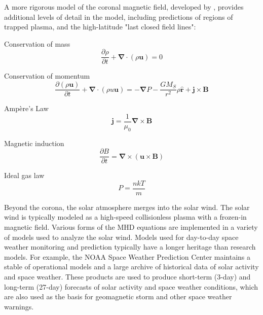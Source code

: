 \documentclass{article}
\begin{document}
A more rigorous model of the coronal magnetic field, developed by \cite{Endeve2003}, provides additional levels of detail in the model, including predictions of regions of trapped plasma, and the high-latitude "last closed field lines":

\bigskip

Conservation of mass
\begin{equation}
    \frac {\partial \rho} {\partial t} + \mathbf \nabla \cdotp \left(\rho \mathbf u \right) = 0
    \label{eq:ELH1}
\end{equation}

Conservation of momentum
\begin{equation}
    \frac {\partial \left( \rho \mathbf u \right)} {\partial t} + \mathbf \nabla \cdotp \left(\rho u \mathbf u \right) = - \mathbf \nabla P - \frac {G M_S} {r^2} \rho \mathbf {\hat r} + \mathbf j \times \mathbf B
    \label{eq:ELH2}
\end{equation}

Amp\`ere's Law
\begin{equation}
    \mathbf j = \frac {1} {\mu_0} \mathbf \nabla \times \mathbf B
    \label{eq:ELH3}
\end{equation}

Magnetic induction
\begin{equation}
    \frac {\partial B} {\partial t} = \mathbf \nabla \times \left( \mathbf u \times \mathbf B \right)
    \label{eq:ELH4}
\end{equation}

Ideal gas law
\begin{equation}
    P = \frac {n k T} {m}
    \label{eq:ELH5}
\end{equation}

Beyond the corona, the solar atmosphere merges into the solar wind. The solar wind is typically modeled as a high-speed collisionless plasma with a frozen-in magnetic field. Various forms of the MHD equations are implemented in a variety of models used to analyze the solar wind. Models used for day-to-day space weather monitoring and prediction typically have a longer heritage than research models. For example, the NOAA Space Weather Prediction Center \cite{swpc} maintains a stable of operational models and a large archive of historical data of solar activity and space weather. These products are used to produce short-term (3-day) and long-term (27-day) forecasts of solar activity and space weather conditions, which are also used as the basis for geomagnetic storm and other space weather warnings.
\end{document}
